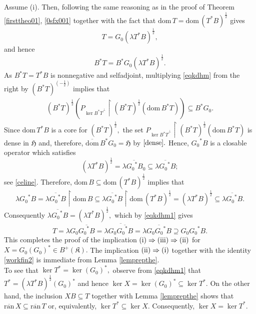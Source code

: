 \documentclass{amsart}
\makeatletter
\newcommand{\h}{\mathfrak{H}}
\newcommand{\kk}{\mathfrak{K}}
\newcommand{\ranbar}{\overline{\mathrm{ran}}\,}
\newcommand{\ranbarT}{\mathrm{\overline{ran}}\, T}
\newcommand{\dombar}{\overline{\mathrm{dom}}\,}%
\newcommand{\D}{\mathrm{dom}\,}
\newcommand{\DT}{\mathrm{dom}\,T }
\newcommand{\DB}{\mathrm{dom}\,B }
\newcommand{\adj}{^*}
\newcommand{\tstar}{T^{*}}
\newcommand{\halfltsb}{(\lambda  T^*B)^{\frac{1}{2}}}
\newcommand{\halftsb}{( T^*B)^{\frac{1}{2}}}
\newcommand{\halfbt}{( B^* T)^{\frac{1}{2}}}
\newcommand{\orth}{^\perp}
\newcommand{\inclu}{\subseteq}
\newcommand{\lplusk}{B^{+}(\kk)}
\newcommand{\rest}{\upharpoonright}
\numberwithin{equation}{section}
\renewenvironment{proof}[1][\proofname]{%
   \par\pushQED{\qed}\normalfont%
   \topsep6\p@\@plus6\p@\relax
   \trivlist\item[\hskip\labelsep\bfseries#1\@addpunct{.}]%
   \ignorespaces
}{%
   \popQED\endtrivlist\@endpefalse
}
\makeatother
\begin{document}
\begin{proof} Assume (i). Then, following the same reasoning as   in the proof of Theorem \ref{firsttheo01}, \eqref{0sfx001} together with the fact that $\DT = \D \halftsb$ gives
      \begin{equation}\label{eqkdhm1}
       T= G_0 \halfltsb,
       \end{equation}
   and hence
    \begin{equation}\label{eqkdhm}
      B\adj T= B\adj G_0 \halfltsb.
    \end{equation}
  As $B\adj T = \tstar B $ is nonnegative and selfadjoint, multiplying \eqref{eqkdhm} from the right by $( B\adj T )^{(-\frac{1}{2})}$ implies that
  \begin{eqnarray}
  \halfbt \left( P_{{\ker B\adj T}\orth} \rest  \halfbt( \D B\adj T)   \right)    \inclu B\adj G_0 \label{dense} .
  \end{eqnarray}
 Since  $\D \tstar B$ is a core for $\halfbt,$ the set $P_{{\ker B\adj T}\orth} \rest  \halfbt( \D B\adj T)$ is dense in $\h$  and, therefore, $\dombar B\adj G_0 =\h$ by $\eqref{dense}.$  Hence,  $ {G_0}\adj B $ is a closable operator which satisfies
  $$
  \halfltsb = \overline{\lambda {G_0}\adj B_0} \inclu  \overline{\lambda {G_0}\adj B};
    $$
    see  \eqref{celine}.
    Therefore, $\DB \inclu \D \halftsb$ implies that
    $$
   \lambda {G_0}\adj B= \overline{\lambda {G_0}\adj B} \rest  \DB  \inclu \overline{\lambda {G_0}\adj B} \rest  \D \halftsb   =  \halfltsb  \inclu \overline{\lambda {G_0}\adj B}.
    $$
    Consequently  $ \overline{\lambda {G_0}\adj B} =   \halfltsb,$ which by \eqref{eqkdhm1} gives
    $$
     T= \lambda G_0   \overline{ {G_0}\adj B} = \lambda \overline{ G_0   \overline{ {G_0}\adj B} } = \lambda  \overline{ G_0     {G_0}\adj B } \supseteq G_0     {G_0}\adj B.
     $$
        This completes the proof of the implication $ \rm (i) \Rightarrow (iii) \Rightarrow (ii)$ for $X = G_0 (G_0)\adj \in \lplusk.$ The implication  $ \rm (ii) \Rightarrow (i)$ together with the identity \eqref{workfin2} is immediate from Lemma \ref{lemprepthe}.\\
        \hspace*{0.4cm} To see that $\ker \tstar = \ker (G_0)\adj,$ observe from   \eqref{eqkdhm1} that $\tstar=  \halfltsb (G_0)\adj$ and hence $ \ker X= \ker(G_0)\adj \inclu \ker \tstar.$  On the other hand,   the inclusion $XB \inclu T$ together with Lemma \ref{lemprepthe} shows that $\ranbar X \inclu \ranbarT$ or, equivalently, $\ker \tstar \inclu \ker X.$   Consequently, $\ker X=\ker \tstar.$
\end{proof}
\end{document}
